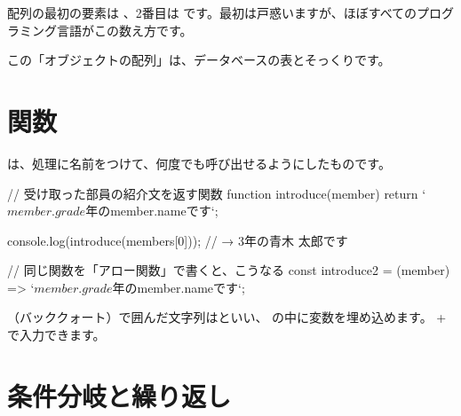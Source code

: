 \begin{why}
配列の最初の要素は \code{[0]}、2番目は \code{[1]} です。最初は戸惑いますが、ほぼすべてのプログラミング言語がこの数え方です。
\end{why}

この「オブジェクトの配列」は、データベースの表とそっくりです。

\begin{center}
\end{center}

\section{関数}

は、処理に名前をつけて、何度でも呼び出せるようにしたものです。

\begin{Piton}[language=code]
// 受け取った部員の紹介文を返す関数
function introduce(member) {
  return `${member.grade}年の${member.name}です`;
}

console.log(introduce(members[0]));   // → 3年の青木 太郎です

// 同じ関数を「アロー関数」で書くと、こうなる
const introduce2 = (member) => `${member.grade}年の${member.name}です`;
\end{Piton}

（バッククォート）で囲んだ文字列はといい、\code{\$\{ \}} の中に変数を埋め込めます。
+ で入力できます。

\section{条件分岐と繰り返し}

